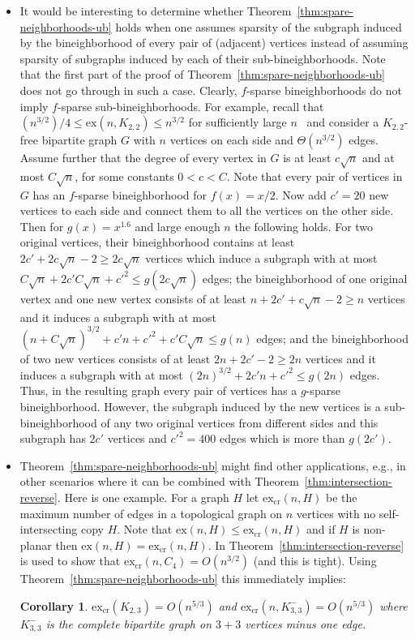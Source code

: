 \documentclass[11pt]{article}
\newtheorem{corollary}{Corollary}
\theoremstyle{definition}
\newcommand{\ex}{\mbox{ex}}
\begin{document}
\begin{itemize}
	\item
	It would be interesting to determine whether Theorem~\ref{thm:spare-neighborhoods-ub} holds when one assumes sparsity of the subgraph induced by the bineighborhood of every pair of (adjacent) vertices instead of assuming sparsity of subgraphs induced by each of their sub-bineighborhoods.
	Note that the first part of the proof of Theorem~\ref{thm:spare-neighborhoods-ub} does not go through in such a case. 
	Clearly, $f$-sparse bineighborhoods do not imply $f$-sparse sub-bineighborhoods.
	For example, recall that $(n^{3/2})/4 \le \mbox{ex}(n,K_{2,2}) \le n^{3/2}$ for sufficiently large $n$~\cite{Kovari} and consider a $K_{2,2}$-free bipartite graph $G$ with $n$ vertices on each side and $\Theta(n^{3/2})$ edges. 
	Assume further that the degree of every vertex in $G$ is at least $c\sqrt{n}$ and at most $C\sqrt{n}$, for some constants $0<c<C$.
	Note that every pair of vertices in $G$ has an $f$-sparse bineighborhood for $f(x)=x/2$.
	Now add $c'=20$ new vertices to each side and connect them to all the vertices on the other side.
	Then for $g(x)=x^{1.6}$ and large enough $n$ the following holds.
	For two original vertices, their bineighborhood contains at least $2c' + 2c\sqrt{n} -2\ge 2c\sqrt{n}$ vertices which induce a subgraph with at most $C\sqrt{n}+2c'C\sqrt{n} + c'^2\le g(2c\sqrt{n})$ edges;
	the bineighborhood of one original vertex and one new vertex consists of at least $n+2c'+c\sqrt{n}-2\ge n$ vertices and it induces a subgraph with at most $(n+C\sqrt{n})^{3/2}+c'n+c'^2+c'C\sqrt{n} \le g(n)$ edges;
	and the bineighborhood of two new vertices consists of at least $2n+2c'-2\ge 2n$ vertices and it induces a subgraph with at most $(2n)^{3/2} + 2c'n +c'^2 \le g(2n)$ edges.
	Thus, in the resulting graph every pair of vertices has a $g$-sparse bineighborhood.
	However, the subgraph induced by the new vertices is a sub-bineighborhood of any two original vertices from different sides and this subgraph has $2c'$ vertices and $c'^2=400$ edges which is more than $g(2c')$.

	\item 
	Theorem~\ref{thm:spare-neighborhoods-ub} might find other applications, e.g., in other scenarios where it can be combined with Theorem~\ref{thm:intersection-reverse}. 
	Here is one example. For a graph $H$ let $\ex_{\textrm{cr}}(n,H)$ be the maximum number of edges in a topological graph on $n$ vertices with no self-intersecting copy $H$. Note that $\ex(n,H)\le \ex_{\textrm{cr}}(n,H)$ and if $H$ is non-planar then $\ex(n,H)=\ex_{\textrm{cr}}(n,H)$. 
	In \cite{janzer2025} Theorem~\ref{thm:intersection-reverse} is used to show that $\ex_{\textrm{cr}}(n,C_4)=O(n^{3/2})$ (and this is tight). Using Theorem~\ref{thm:spare-neighborhoods-ub} this immediately implies:
	\begin{corollary}
		$\ex_{\textrm{cr}}(K_{2,3})=O(n^{5/3})$ and $\ex_{\textrm{cr}}(n,K_{3,3}^-)=O(n^{5/3})$ where $K_{3,3}^-$ is the complete bipartite graph on $3+3$ vertices minus one edge.
	\end{corollary}
\end{itemize}
\end{document}
